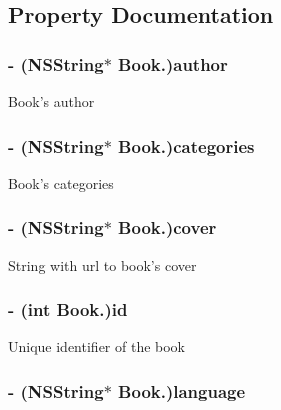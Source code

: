 \subsection{Property Documentation}
\hypertarget{interface_book_a9612be5178b7b2d676b32e77a436580a}{
\subsubsection[{author}]{\setlength{\rightskip}{0pt plus 5cm}-\/ (NSString$\ast$ Book.)author}}
\label{interface_book_a9612be5178b7b2d676b32e77a436580a}
Book's author \hypertarget{interface_book_a5d02b41a17f0bf3da50e4613762d3865}{
\subsubsection[{categories}]{\setlength{\rightskip}{0pt plus 5cm}-\/ (NSString$\ast$ Book.)categories}}
\label{interface_book_a5d02b41a17f0bf3da50e4613762d3865}
Book's categories \hypertarget{interface_book_ab9a2eba00a1c12702737db9f315cb1e8}{
\subsubsection[{cover}]{\setlength{\rightskip}{0pt plus 5cm}-\/ (NSString$\ast$ Book.)cover}}
\label{interface_book_ab9a2eba00a1c12702737db9f315cb1e8}
String with url to book's cover \hypertarget{interface_book_ade1e6376cdb0417bd207733607f6669a}{
\subsubsection[{id}]{\setlength{\rightskip}{0pt plus 5cm}-\/ (int Book.)id}}
\label{interface_book_ade1e6376cdb0417bd207733607f6669a}
Unique identifier of the book \hypertarget{interface_book_a410185f5b9cba8002f29c7b90efc63fd}{
\subsubsection[{language}]{\setlength{\rightskip}{0pt plus 5cm}-\/ (NSString$\ast$ Book.)language}}
